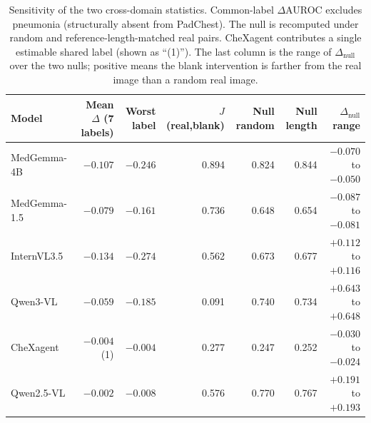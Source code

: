 \begin{table}[H]
\centering
\footnotesize
\setlength{\tabcolsep}{3pt}
\caption{Sensitivity of the two cross-domain statistics. Common-label $\Delta$AUROC excludes pneumonia (structurally absent from PadChest). The null is recomputed under random and reference-length-matched real pairs. CheXagent contributes a single estimable shared label (shown as ``(1)''). The last column is the range of $\Delta_{\text{null}}$ over the two nulls; positive means the blank intervention is farther from the real image than a random real image.}
\label{tab:sens}
\begin{tabular}{lrrrrrr}
\toprule
Model & Mean $\Delta$ (7 labels) & Worst label & $J$(real,blank) & Null random & Null length & $\Delta_{\text{null}}$ range \\
\midrule
MedGemma-4B & $-0.107$ & $-0.246$ & 0.894 & 0.824 & 0.844 & $-0.070$ to $-0.050$ \\
MedGemma-1.5 & $-0.079$ & $-0.161$ & 0.736 & 0.648 & 0.654 & $-0.087$ to $-0.081$ \\
InternVL3.5 & $-0.134$ & $-0.274$ & 0.562 & 0.673 & 0.677 & $+0.112$ to $+0.116$ \\
Qwen3-VL & $-0.059$ & $-0.185$ & 0.091 & 0.740 & 0.734 & $+0.643$ to $+0.648$ \\
CheXagent & $-0.004$ (1) & $-0.004$ & 0.277 & 0.247 & 0.252 & $-0.030$ to $-0.024$ \\
Qwen2.5-VL & $-0.002$ & $-0.008$ & 0.576 & 0.770 & 0.767 & $+0.191$ to $+0.193$ \\
\bottomrule
\end{tabular}
\end{table}

